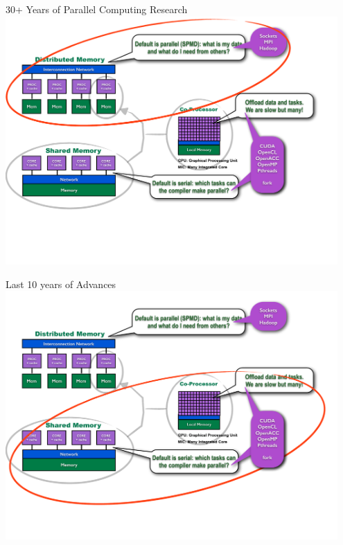 \begin{frame}{30+ Years of Parallel Computing Research}
\includegraphics[width=0.95\textwidth]
{../common/pics/hardware/ParallelHardware7.pdf}
\end{frame}

\begin{frame}{Last 10 years of Advances}
\includegraphics[width=0.95\textwidth]
{../common/pics/hardware/ParallelHardware8.pdf}
\end{frame}

